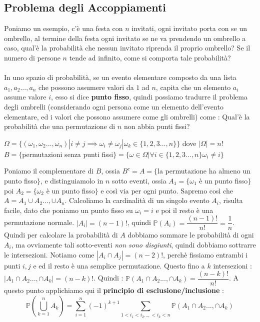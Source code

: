 \documentclass[12pt, letterpaper]{article}
\begin{document}
\subsection{Problema degli Accoppiamenti}
Poniamo un esempio, c'è una festa con \(n\) invitati, ogni invitato porta con se un ombrello, 
al termine della festa ogni invitato se ne va prendendo un ombrello a caso, qual'è la probabilità 
che nessun invitato riprenda il proprio ombrello? Se il numero di persone \(n\) tende ad 
infinito, come si comporta tale probabilità?\\\hphantom{.}\\ In uno spazio di probabilità, 
se un evento elementare composto da una lista \(a_1,a_2...,a_n\) che possono assumere 
valori da \(1\) ad \(n\), capita che un elemento \(a_i\) assume valore \(i\), esso si dice \textbf{punto fisso},
quindi possiamo tradurre il problema degli ombrelli (considerando ogni persona come un elemento dell'evento 
elementare, ed i valori che possono assumere come gli ombrelli) come : Qual'è la probabilità che una permutazione 
di \(n\) non abbia punti fissi?\begin{center}
    \(\Omega=\{(\omega_1,\omega_2...,\omega_n)|i\ne j \implies \omega_i\ne \omega_j |\omega_k \in \{1,2,3...,n\} \}\) dove \(|\Omega|=n!\)
    \\\(B=\{\)permutazioni senza punti fissi\(\}=\{\omega\in\Omega | \forall i \in\{1,2,3...,n\} \omega_i\ne i \}\)
\end{center}
Poniamo il complementare di \(B\), ossia \(B^c=A=\{\)la permutazione ha almeno un punto fisso\(\}\), e distinguiamolo 
in \(n\) sotto eventi, ossia \(A_1=\{\omega_1\) è un punto fisso\(\}\) poi 
\(A_2=\{\omega_2\) è un punto fisso\(\}\) e così via per ogni punto. Sapremo così che 
\(A=A_1\cup A_2..., \cup A_n\). Calcoliamo la cardinalità di un singolo evento \(A_i\), risulta 
facile, dato che poniamo un punto fisso su \(\omega_i = i\) e poi il resto è una permutazione 
normale. \(|A_i|=(n-1)!\), quindi \(\mathbb{P}(A_i)=\dfrac{(n-1)!}{n!}=\dfrac{1}{n}\). Quindi per calcolare 
la probabilità di \(A\) dobbiamo sommare le probabilità di ogni \(A_i\), ma ovviamente tali sotto-eventi 
\textit{non sono disgiunti}, quindi dobbiamo sottrarre le intersezioni.
Notiamo come \(|A_i\cap A_j|=(n-2)!\), perchè fissiamo entrambi i punti \(i,j\) e ed il resto 
è una semplice permutazione. Questo fino a \(k\) intersezioni : \(|A_1\cap A_2...,\cap A_k|=(n-k)!\). Quindi :
\(\mathbb{P}(A_1\cap A_2...,\cap A_k) =\dfrac{(n-k)!}{n!}\). A questo punto applichiamo qui il 
\textbf{principio di esclusione/inclusione} :\begin{equation}
    \mathbb{P}(\bigcup^n_{k=1}A_k )=\sum_{i=1}^n (-1)^{k+1}\sum_{1<i_1<i_2...,<i_k<n}\mathbb{P}(A_1\cap A_2...,\cap A_k)
\end{equation}
\end{document}
